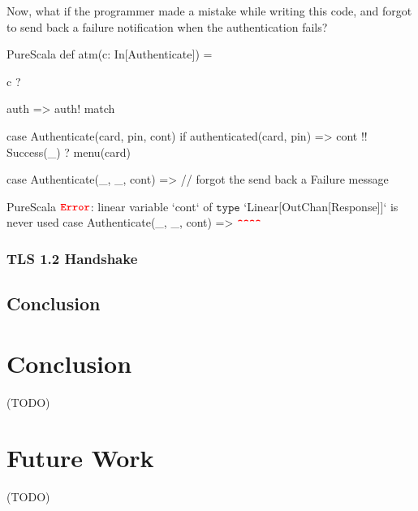 \documentclass[a4paper,twoside]{article}
\newcommand{\TODO}[1]{\textcolor{YellowOrange}{(TODO)}} %
\begin{document}
Now, what if the programmer made a mistake while writing this code, and forgot to send back a failure notification when the authentication fails?

\begin{ShortCode}{PureScala}
def atm(c: In[Authenticate]) = {
  c ? { auth => auth! match {  
    case Authenticate(card, pin, cont) if authenticated(card, pin) =>
      cont !! Success(_) ? menu(card)
  
    case Authenticate(_, _, cont)  =>
      // forgot the send back a Failure message
  } }
}
\end{ShortCode}

\begin{ShortCode}{PureScala}
$\texttt{\textbf{\textcolor{Red}{Error}}}$: linear variable `cont` of $\texttt{type}$ `Linear[OutChan[Response]]` is never used
                 case Authenticate(_, _, cont) =>
                                         $\texttt{\textbf{\textcolor{Red}{\textasciicircum\textasciicircum\textasciicircum\textasciicircum}}}$
\end{ShortCode}

\subsubsection{TLS 1.2 Handshake}

\subsection{Conclusion}

\clearpage
\section{Conclusion}
\label{conclusion}

\TODO{Conclusion}

\section{Future Work}
\label{futurework}

\TODO{Future Work}

\appendix

\clearpage

\nocite{*}


\end{document}
